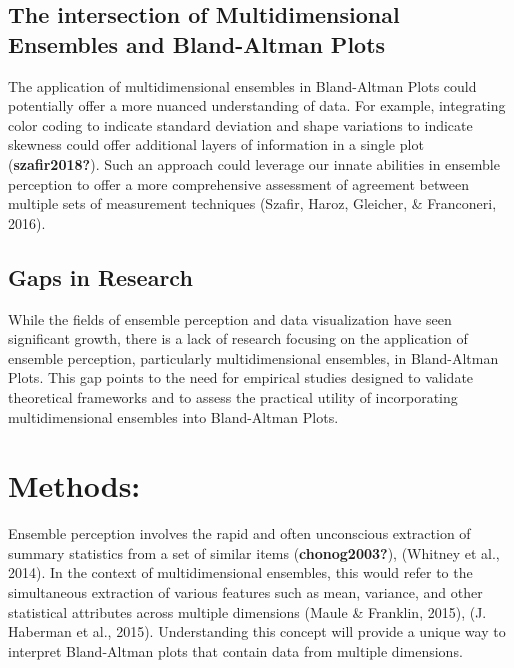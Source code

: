 \documentclass[print]{nuthesis}
\begin{document}
\hypertarget{the-intersection-of-multidimensional-ensembles-and-bland-altman-plots}{%
\subsection{The intersection of Multidimensional Ensembles and Bland-Altman Plots}\label{the-intersection-of-multidimensional-ensembles-and-bland-altman-plots}}

The application of multidimensional ensembles in Bland-Altman Plots could potentially offer a more nuanced understanding of data.
For example, integrating color coding to indicate standard deviation and shape variations to indicate skewness could offer additional layers of information in a single plot (\textbf{szafir2018?}).
Such an approach could leverage our innate abilities in ensemble perception to offer a more comprehensive assessment of agreement between multiple sets of measurement techniques (Szafir, Haroz, Gleicher, \& Franconeri, 2016).

\hypertarget{gaps-in-research}{%
\subsection{Gaps in Research}\label{gaps-in-research}}

While the fields of ensemble perception and data visualization have seen significant growth, there is a lack of research focusing on the application of ensemble perception, particularly multidimensional ensembles, in Bland-Altman Plots.
This gap points to the need for empirical studies designed to validate theoretical frameworks and to assess the practical utility of incorporating multidimensional ensembles into Bland-Altman Plots.

\hypertarget{methods}{%
\section{Methods:}\label{methods}}

Ensemble perception involves the rapid and often unconscious extraction of summary statistics from a set of similar items (\textbf{chonog2003?}), (Whitney et al., 2014).
In the context of multidimensional ensembles, this would refer to the simultaneous extraction of various features such as mean, variance, and other statistical attributes across multiple dimensions (Maule \& Franklin, 2015), (J. Haberman et al., 2015).
Understanding this concept will provide a unique way to interpret Bland-Altman plots that contain data from multiple dimensions.
\end{document}
